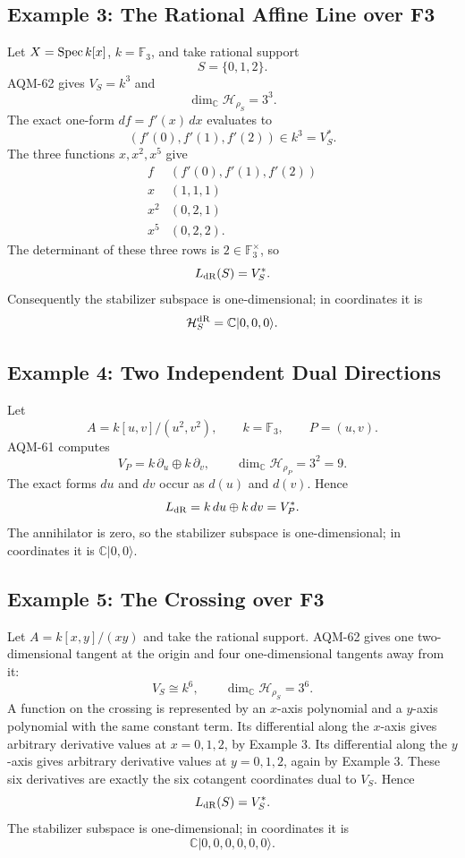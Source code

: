 \subsection{Example 3: The Rational Affine Line over F3}

Let \(X=\operatorname{Spec} k[x]\), \(k=\mathbb F_3\), and take rational support
\[
  S=\{0,1,2\}.
\]
AQM-62 gives \(V_S=k^3\) and
\[
  \dim_{\mathbb C}\mathcal H_{\rho_S}=3^3.
\]
The exact one-form \(df=f'(x)\,dx\) evaluates to
\[
  (f'(0),f'(1),f'(2))\in k^3=V_S^*.
\]
The three functions \(x,x^2,x^5\) give
\[
\begin{array}{c|c}
f & (f'(0),f'(1),f'(2))\\ \hline
x & (1,1,1)\\
x^2 & (0,2,1)\\
x^5 & (0,2,2).
\end{array}
\]
The determinant of these three rows is \(2\in\mathbb F_3^\times\), so
\[
  L_{\rm dR}(S)=V_S^*.
\]
Consequently the stabilizer subspace is one-dimensional; in coordinates it is
\[
  \mathcal H_S^{\rm dR}=\mathbb C|0,0,0\rangle.
\]

\subsection{Example 4: Two Independent Dual Directions}

Let
\[
  A=k[u,v]/(u^2,v^2),\qquad k=\mathbb F_3,\qquad P=(u,v).
\]
AQM-61 computes
\[
  V_P=k\,\partial_u\oplus k\,\partial_v,\qquad
  \dim_{\mathbb C}\mathcal H_{\rho_P}=3^2=9.
\]
The exact forms \(du\) and \(dv\) occur as \(d(u)\) and \(d(v)\).  Hence
\[
  L_{\rm dR}=k\,du\oplus k\,dv=V_P^*.
\]
The annihilator is zero, so the stabilizer subspace is one-dimensional; in
coordinates it is \(\mathbb C|0,0\rangle\).

\subsection{Example 5: The Crossing over F3}

Let \(A=k[x,y]/(xy)\) and take the rational support.  AQM-62 gives one
two-dimensional tangent at the origin and four one-dimensional tangents away
from it:
\[
  V_S\cong k^6,\qquad
  \dim_{\mathbb C}\mathcal H_{\rho_S}=3^6.
\]
A function on the crossing is represented by an \(x\)-axis polynomial and a
\(y\)-axis polynomial with the same constant term.  Its differential along the
\(x\)-axis gives arbitrary derivative values at \(x=0,1,2\), by Example 3.
Its differential along the \(y\)-axis gives arbitrary derivative values at
\(y=0,1,2\), again by Example 3.  These six derivatives are exactly the six
cotangent coordinates dual to \(V_S\).  Hence
\[
  L_{\rm dR}(S)=V_S^*.
\]
The stabilizer subspace is one-dimensional; in coordinates it is
\[
  \mathbb C|0,0,0,0,0,0\rangle.
\]

